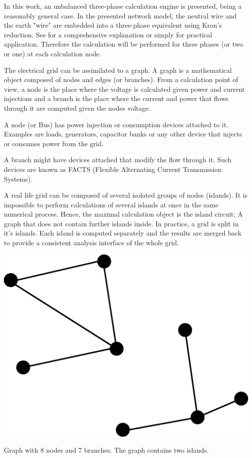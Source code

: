 \documentclass[nols,a4paper,twoside,symmetric,notoc,fleqn]{tufte-book}
\begin{document}
In this work, an unbalanced three-phase calculation engine is presented, being a reasonably general case. In the presented network model, the neutral wire and the earth "wire" are embedded into a three-phase equivalent using Kron's reduction. See \cite{dorfler2013kron} for a comprehensive explanation or simply \cite{kersting2012distribution} for practical application. Therefore the calculation will be performed for three phases (or two or one) at each calculation node.

The electrical grid can be assimilated to a graph. A graph is a mathematical object composed of nodes and edges (or branches). From a calculation point of view, a node is the place where the voltage is calculated given power and current injections and a branch is the place where the current and power that flows through it are computed given the nodes voltage.

A node (or Bus) has power injection or consumption devices attached to it. Examples are loads, generators, capacitor banks or any other device that injects or consumes power from the grid.

A branch might have devices attached that modify the flow through it. Such devices are known as FACTS (Flexible Alternating Current Transmission Systems). 

A real life grid can be composed of several isolated groups of nodes (islands). It is impossible to perform calculations of several islands at once in the same numerical process. Hence, the maximal calculation object is the island circuit; A graph that does not contain further islands inside. In practice, a grid is split in it's islands. Each island is computed separately and the results are merged back to provide a consistent analysis interface of the whole grid.

\begin{marginfigure}
  \includegraphics[width=\linewidth]{img/simple_two_island_graph.eps}
  \caption{Graph with 8 nodes and 7 branches. The graph contains two islands.}
  \label{fig:simple_two_island_graph}
\end{marginfigure}
\end{document}
